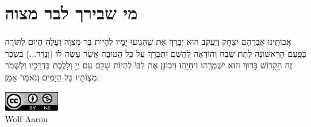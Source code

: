 \documentclass[a4paper, twoside, openany, parskip=half, 12pt]{article}
\begin{document}
\section*{מי שבירך לבר מצוה}
אֲבוֹתֵֽינוּ אַבְרָהָם יִצְחָק וְיַעֲקֹב הוּא יְבָרֵךְ אֶת 
 שֶׁהִגִֽיעוּ יָמָיו לִהְיוֹת בַּר מִצְוָה וְעָלָה הַיוֹם לַתּוֹרָה בַּפַּֽעַם הָרִאשׁוֹנָה לָתֵת שֶֽׁבַח וְהוֹדָאָה לְהַשֵׁם יִתְבָּרַךְ עַל כָּל הַטוֹבָה אֲשֶׁר עָשָׂה לוֹ (וְנָדַר...) בִּשְׂכַר זֶה הַקָדוֹשׁ בָּרוּךְ הוּא יִשְׁמְרֵֽהוּ וִיחַיֵֽהוּ וִיכוֹנֵן אֶת לִבּוֹ לִהְיוֹת שָׁלֵם עִם יְיָ וְלָלֶֽכֶת בִּדְרָכָיו וְלִשְׁמֹר מִצְוֹתָיו כָּל הַיָמִים וְנֹאמַר אָמֵן:\\

\vfill



\includegraphics[scale=1]{cc.png}\\
Wolf Aaron

\end{document}
